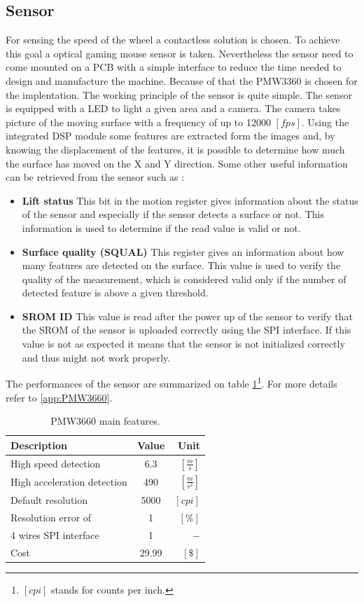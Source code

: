 \documentclass[12pt,a4paper, twoside]{article}
\begin{document}
\subsection{Sensor}
For sensing the speed of the wheel a contactless solution is chosen. To achieve this goal a optical gaming mouse sensor is taken. Nevertheless the sensor need to come mounted on a PCB with a simple interface to reduce the time needed to design and manufacture the machine.
Because of that the PMW3360 is chosen for the implentation.
The working principle of the sensor is quite simple. The sensor is equipped with a LED to light a given area and a camera. The camera takes picture of the moving surface with a frequency of up to 12000 $[fps]$. Using the integrated DSP module some features are extracted form the images and, by knowing the displacement of the features, it is possible to determine how much the surface has moved on the X and Y direction.
Some other useful information can be retrieved from the sensor such as :
\begin{itemize}
	\item \textbf{Lift status} This bit in the motion register gives information about the status of the sensor and especially if the sensor detects a surface or not. This information is used to determine if the read value is valid or not.
	\item \textbf{Surface quality (SQUAL)} This register gives an information about how many features are detected on the surface. This value is used to verify the quality of the measurement, which is considered valid only if the number of detected feature is above a given threshold.
	\item \textbf{SROM ID} This value is read after the power up of the sensor to verify that the SROM of the sensor is uploaded correctly using the SPI interface. If this value is not as expected it means that the sensor is not initialized correctly and thus might not work properly. 
\end{itemize}
The performances of the sensor are summarized on table \ref{tab:PMW3360}\footnote{$[cpi]$ stands for counts per inch.}. For more details refer to \ref{app:PMW3660}.
\begin{table}[H]
	\centering
	\begin{tabular}{l||c|r} 
		\textbf{Description}&\textbf{Value}  &\textbf{Unit}  \\ 
		\hline
		\hline 
		High speed detection & 6.3 & $[\frac{m}{s}]$ \\ 
		\hline 
		High acceleration detection & 490  & $[\frac{m}{s^2}]$  \\ 
		\hline 
		Default resolution & 5000 & $[cpi]$ \\ 
		\hline 
		Resolution error of & 1 & $[\%]$  \\ 
		\hline 
		4 wires SPI interface & 1 & $-$  \\ 
		\hline
		Cost & 29.99 &$[\$]$
	\end{tabular} 
	\caption{PMW3660 main features.}
	\label{tab:PMW3360}
\end{table}
\end{document}
